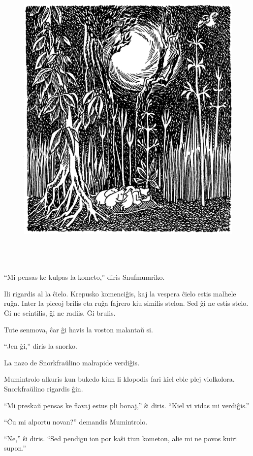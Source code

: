 \begin{figure}[htbp]
\centering
\includegraphics[width=400pt,height=440pt]{5-7.png}
\caption{}
\label{5-7}
\end{figure}

``Mi pensas ke kulpas la kometo,'' diris Snufmumriko.

Ili rigardis al la ĉielo. Krepusko komenciĝis, kaj la vespera ĉielo estis malhele ruĝa. Inter la piceoj brilis eta ruĝa fajrero kiu similis stelon. Sed ĝi ne estis stelo. Ĝi ne scintilis, ĝi ne radiis. Ĝi brulis.

Tute senmova, ĉar ĝi havis la voston malantaŭ si.

``Jen ĝi,'' diris la snorko.

La nazo de Snorkfraŭlino malrapide verdiĝis.

Mumintrolo alkuris kun bukedo kiun li klopodis fari kiel eble plej violkolora. Snorkfraŭlino rigardis ĝin.

``Mi preskaŭ pensas ke flavaj estus pli bonaj,'' ŝi diris. ``Kiel vi vidas mi verdiĝis.''

``Ĉu mi alportu novan?'' demandis Mumintrolo.

``Ne,'' ŝi diris. ``Sed pendigu ion por kaŝi tiun kometon, alie mi ne povos kuiri supon.''

